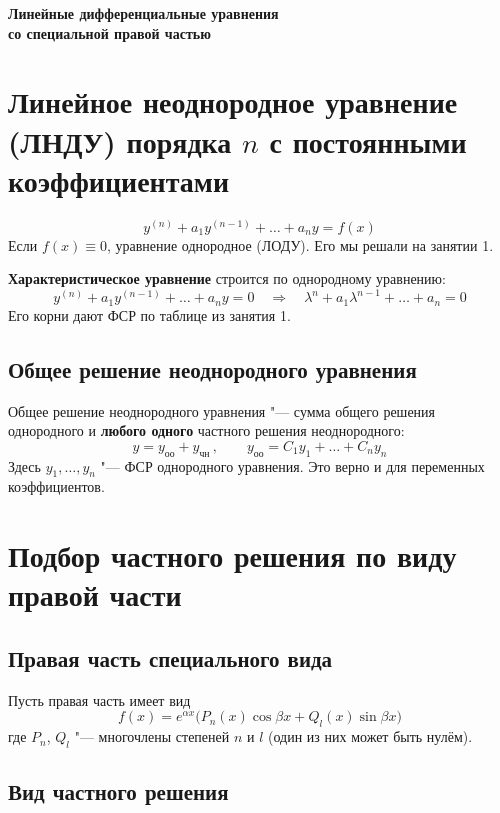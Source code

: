 \documentclass[11pt,a4paper]{article}
\newcommand{\yoo}{y_{\text{оо}}}
\newcommand{\ych}{y_{\text{чн}}}
\begin{document}
\begin{center}
{\LARGE\bfseries  Линейные дифференциальные уравнения \\[2pt]
                  со специальной правой частью }
\end{center}


\section*{Линейное неоднородное уравнение (ЛНДУ) порядка $n$ с постоянными коэффициентами
}

\[
  y^{(n)} + a_1 y^{(n-1)} + \dots + a_n y = f(x)
\]
Если $f(x) \equiv 0$, уравнение однородное (ЛОДУ). Его мы решали на занятии 1.

\textbf{Характеристическое уравнение} строится по однородному уравнению:
\[
  y^{(n)} + a_1 y^{(n-1)} + \dots + a_n y = 0
  \quad\Rightarrow\quad
  \lambda^n + a_1\lambda^{n-1} + \dots + a_n = 0
\]
Его корни дают ФСР по таблице из занятия 1.

\subsection*{Общее решение неоднородного уравнения}

Общее решение неоднородного уравнения "--- сумма общего решения однородного и \textbf{любого одного} частного решения неоднородного:
\[
  y = \yoo + \ych\,, \qquad \yoo = C_1 y_1 + \dots + C_n y_n
\]
Здесь $y_1, \dots, y_n$ "--- ФСР однородного уравнения. Это верно и для переменных коэффициентов.

\section*{Подбор частного решения по виду правой части}

\subsection*{Правая часть специального вида}

Пусть правая часть имеет вид
\[
  f(x) = e^{\alpha x}\bigl(P_n(x)\cos\beta x + Q_l(x)\sin\beta x\bigr)
\]
где $P_n$, $Q_l$ "--- многочлены степеней $n$ и $l$ (один из них может быть нулём).

\subsection*{Вид частного решения}
\end{document}
